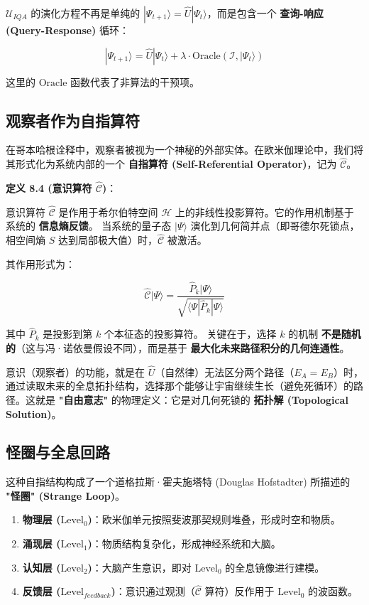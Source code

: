 $\mathcal{U}_{IQA}$ 的演化方程不再是单纯的 $|\Psi_{t+1}\rangle = \hat{U} |\Psi_t\rangle$，而是包含一个 \textbf{查询-响应 (Query-Response)} 循环：

\[|\Psi_{t+1}\rangle = \hat{U} |\Psi_t\rangle + \lambda \cdot \text{Oracle}(\mathcal{I}, |\Psi_t\rangle)\]

这里的 $\text{Oracle}$ 函数代表了非算法的干预项。

\subsection{观察者作为自指算符}

在哥本哈根诠释中，观察者被视为一个神秘的外部实体。在欧米伽理论中，我们将其形式化为系统内部的一个 \textbf{自指算符 (Self-Referential Operator)}，记为 $\hat{\mathcal{C}}$。

\textbf{定义 8.4 (意识算符 $\hat{\mathcal{C}}$)}：

意识算符 $\hat{\mathcal{C}}$ 是作用于希尔伯特空间 $\mathcal{H}$ 上的非线性投影算符。它的作用机制基于系统的 \textbf{信息熵反馈}。
当系统的量子态 $|\Psi\rangle$ 演化到几何简并点（即哥德尔死锁点，相空间熵 $S$ 达到局部极大值）时，$\hat{\mathcal{C}}$ 被激活。

其作用形式为：

\[\hat{\mathcal{C}} |\Psi\rangle = \frac{\hat{P}_k |\Psi\rangle}{\sqrt{\langle \Psi | \hat{P}_k | \Psi \rangle}}\]

其中 $\hat{P}_k$ 是投影到第 $k$ 个本征态的投影算符。
关键在于，选择 $k$ 的机制 \textbf{不是随机的}（这与冯·诺依曼假设不同），而是基于 \textbf{最大化未来路径积分的几何连通性}。

意识（观察者）的功能，就是在 $\hat{U}$（自然律）无法区分两个路径（$E_A = E_B$）时，通过读取未来的全息拓扑结构，选择那个能够让宇宙继续生长（避免死循环）的路径。这就是 \textbf{"自由意志"} 的物理定义：它是对几何死锁的 \textbf{拓扑解 (Topological Solution)}。

\subsection{怪圈与全息回路}

这种自指结构构成了一个道格拉斯·霍夫施塔特 (Douglas Hofstadter) 所描述的 \textbf{"怪圈" (Strange Loop)}。

\begin{enumerate}
\item \textbf{物理层 ($\text{Level}_0$)}：欧米伽单元按照斐波那契规则堆叠，形成时空和物质。
\item \textbf{涌现层 ($\text{Level}_1$)}：物质结构复杂化，形成神经系统和大脑。
\item \textbf{认知层 ($\text{Level}_2$)}：大脑产生意识，即对 $\text{Level}_0$ 的全息镜像进行建模。
\item \textbf{反馈层 ($\text{Level}_{feedback}$)}：意识通过观测（$\hat{\mathcal{C}}$ 算符）反作用于 $\text{Level}_0$ 的波函数。
\end{enumerate}

